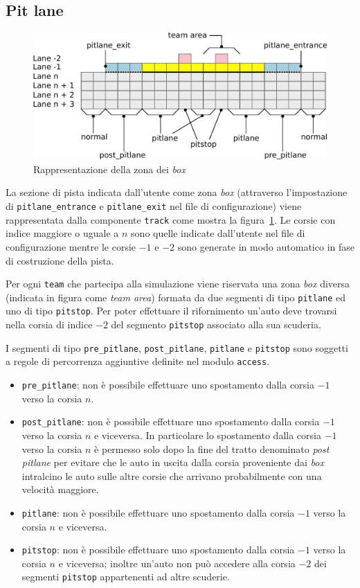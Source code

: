 \subsection{Pit lane}
\begin{figure}
\includegraphics[width=\textwidth]{diagrammi/PitLane}
\caption{Rappresentazione della zona dei \textit{box}}
\label{fig:pitLane}
\end{figure}

La sezione di pista indicata dall'utente come zona \textit{box} (attraverso l'impostazione di \texttt{pitlane\_entrance} e \texttt{pitlane\_exit} nel file di configurazione) viene rappresentata dalla componente \texttt{track} come mostra la figura~\ref{fig:pitLane}. Le corsie con indice maggiore o uguale a $n$ sono quelle indicate dall'utente nel file di configurazione mentre le corsie $-1$ e $-2$ sono generate in modo automatico in fase di costruzione della pista.

Per ogni \texttt{team} che partecipa alla simulazione viene riservata una zona \textit{box} diversa (indicata in figura come \textit{team area}) formata da due segmenti di tipo \texttt{pitlane} ed uno di tipo \texttt{pitstop}. Per poter effettuare il rifornimento un'auto deve trovarsi nella corsia di indice $-2$ del segmento \texttt{pitstop} associato alla sua scuderia.

I segmenti di tipo \texttt{pre\_pitlane}, \texttt{post\_pitlane}, \texttt{pitlane} e \texttt{pitstop} sono soggetti a regole di percorrenza aggiuntive definite nel modulo \texttt{access}.
\begin{itemize}
\item \texttt{pre\_pitlane}: non è possibile effettuare uno spostamento dalla corsia $-1$ verso la corsia $n$.
\item \texttt{post\_pitlane}: non è possibile effettuare uno spostamento dalla corsia $-1$ verso la corsia $n$ e viceversa. In particolare lo spostamento dalla corsia $-1$ verso la corsia $n$ è permesso solo dopo la fine del tratto denominato \textit{post pitlane} per evitare che le auto in uscita dalla corsia proveniente dai \textit{box} intralcino le auto sulle altre corsie che arrivano probabilmente con una velocità maggiore.
\item \texttt{pitlane}: non è possibile effettuare uno spostamento dalla corsia $-1$ verso la corsia $n$ e viceversa.
\item \texttt{pitstop}: non è possibile effettuare uno spostamento dalla corsia $-1$ verso la corsia $n$ e viceversa; inoltre un'auto non può accedere alla corsia $-2$ dei segmenti \texttt{pitstop} appartenenti ad altre scuderie.
\end{itemize}

